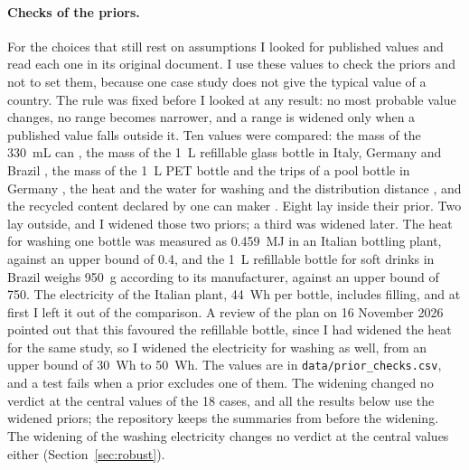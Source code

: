 \documentclass{article}
\begin{document}
\paragraph{Checks of the priors.}
For the choices that still rest on assumptions I looked for published values and read each one in its
original document. I use these values to check the priors and not to set them, because one case study does
not give the typical value of a country. The rule was fixed before I looked at any result: no most
probable value changes, no range becomes narrower, and a range is widened only when a published value
falls outside it. Ten values were compared: the mass of the 330~mL can \citep{mpe2022}, the mass of the 1~L
refillable glass bottle in Italy, Germany and Brazil \citep{tua2020,schonert2002,morini2019}, the mass of
the 1~L PET bottle and the trips of a pool bottle in Germany \citep{schonert2002}, the heat and the water
for washing and the distribution distance \citep{tua2020}, and the recycled content declared by one can
maker \citep{ardagh2021}. Eight lay inside their prior. Two lay outside, and I widened those two priors; a third was widened later.
The heat for washing one bottle was measured as 0.459~MJ in an Italian bottling plant, against an upper
bound of 0.4, and the 1~L refillable bottle for soft drinks in Brazil weighs 950~g according to its
manufacturer, against an upper bound of 750. The electricity of the Italian plant, 44~Wh per bottle,
includes filling, and at first I left it out of the comparison. A review of the plan on 16 November 2026
pointed out that this favoured the refillable bottle, since I had widened the heat for the same study, so
I widened the electricity for washing as well, from an upper bound of 30~Wh to 50~Wh. The values
are in \texttt{data/prior\_checks.csv}, and a test fails when a prior excludes one of them. The widening
changed no verdict at the central values of the 18 cases, and all the results below use the widened priors;
the repository keeps the summaries from before the widening. The widening of the washing electricity changes no verdict at the central values either (Section~\ref{sec:robust}).
\end{document}
